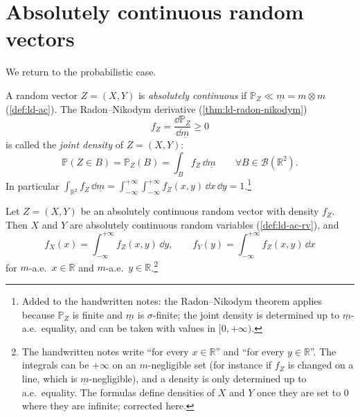 \section{Absolutely continuous random vectors}\label{sec:pm-ac-vectors}

We return to the probabilistic case.

\begin{definition}\label{def:pm-ac-vector}
A random vector $Z=(X,Y)$ is \emph{absolutely continuous} if
$\mathbb P_Z\ll\underline m=m\otimes m$ (\cref{def:ld-ac}). The Radon--Nikodym derivative
(\cref{thm:ld-radon-nikodym})
\[
  f_Z=\frac{\dd\mathbb P_Z}{\dd\underline m}\ge0
\]
is called the \emph{joint density} of $Z=(X,Y)$:
\[
  \mathbb P(Z\in B)=\mathbb P_Z(B)=\int_Bf_Z\,\dd\underline m\qquad\forall B\in\mathcal B(\mathbb R^2).
\]
In particular
$\int_{\mathbb R^2}f_Z\,\dd\underline m=\int_{-\infty}^{+\infty}\int_{-\infty}^{+\infty}f_Z(x,y)\,\dd x\,\dd y=1$.\footnote{Added
to the handwritten notes: the Radon--Nikodym theorem applies because $\mathbb P_Z$ is finite
and $\underline m$ is $\sigma$-finite; the joint density is determined up to
$\underline m$-a.e.\ equality, and can be taken with values in $[0,+\infty)$.}
\end{definition}

\begin{proposition}\label{prop:pm-marginal-density}
Let $Z=(X,Y)$ be an absolutely continuous random vector with density $f_Z$. Then $X$ and $Y$
are absolutely continuous random variables (\cref{def:ld-ac-rv}), and
\[
  f_X(x)=\int_{-\infty}^{+\infty}f_Z(x,y)\,\dd y,\qquad
  f_Y(y)=\int_{-\infty}^{+\infty}f_Z(x,y)\,\dd x
\]
for $m$-a.e.\ $x\in\mathbb R$ and $m$-a.e.\ $y\in\mathbb R$.\footnote{The handwritten notes write
``for every $x\in\mathbb R$'' and ``for every $y\in\mathbb R$''. The integrals can be
$+\infty$ on an $m$-negligible set (for instance if $f_Z$ is changed on a line, which is
$\underline m$-negligible), and a density is only determined up to a.e.\ equality. The
formulas define densities of $X$ and $Y$ once they are set to $0$ where they are infinite;
corrected here.}
\end{proposition}

